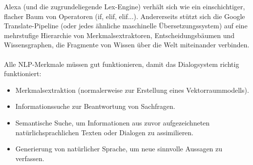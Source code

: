 Alexa (und die zugrundeliegende Lex-Engine) verhält sich wie ein einschichtiger, flacher Baum von Operatoren (if, elif, elif...). 
Andererseits stützt sich die Google Translate-Pipeline (oder jedes ähnliche maschinelle Übersetzungssystem) auf eine mehrstufige Hierarchie von Merkmalsextraktoren, Entscheidungsbäumen und Wissensgraphen, die Fragmente von Wissen über die Welt miteinander verbinden.\\\\
Alle \ac{NLP}-Merkmale müssen gut funktionieren, damit das Dialogsystem richtig funktioniert:
\begin{itemize}
    \item Merkmalsextraktion (normalerweise zur Erstellung eines Vektorraummodells).
    \item Informationssuche zur Beantwortung von Sachfragen.
    \item Semantische Suche, um Informationen aus zuvor aufgezeichneten natürlichsprachlichen Texten oder Dialogen zu assimilieren.
    \item Generierung von natürlicher Sprache, um neue sinnvolle Aussagen zu verfassen.
\end{itemize}
